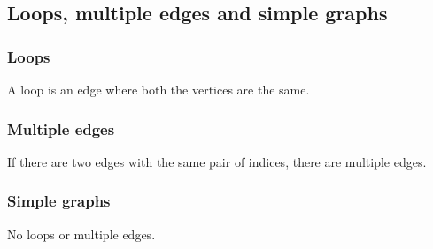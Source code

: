 
\subsection{Loops, multiple edges and simple graphs}

\subsubsection{Loops}

A loop is an edge where both the vertices are the same.

\subsubsection{Multiple edges}

If there are two edges with the same pair of indices, there are multiple edges.

\subsubsection{Simple graphs}

No loops or multiple edges.

